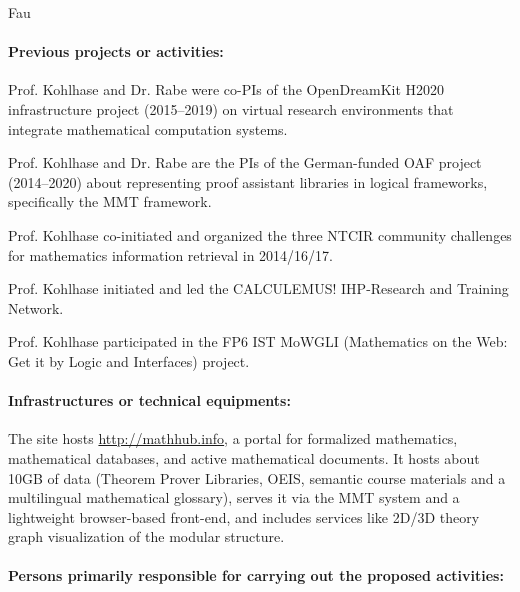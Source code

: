 \begin{sitedescription}{Fau}
\paragraph*{Previous projects or activities:}


\begin{compactitem}
 \item Prof. Kohlhase and Dr. Rabe were co-PIs of the OpenDreamKit H2020 infrastructure project (2015--2019) on virtual research environments that integrate mathematical computation systems.
 \item Prof. Kohlhase and Dr. Rabe are the PIs of the German-funded OAF project (2014--2020) about representing proof assistant libraries in logical frameworks, specifically the MMT framework.
 \item Prof. Kohlhase co-initiated and organized the three NTCIR community challenges for mathematics information retrieval in 2014/16/17.
 \item Prof. Kohlhase initiated and led the CALCULEMUS! IHP-Research and Training Network.
 \item Prof. Kohlhase participated in the FP6 IST MoWGLI (Mathematics on the Web: Get it by Logic and Interfaces) project.
\end{compactitem}

\paragraph*{Infrastructures or technical equipments:}

\begin{compactitem}
\item The site hosts \url{http://mathhub.info}, a portal for formalized mathematics, mathematical databases, and active mathematical documents.
It hosts about 10GB of data (Theorem Prover Libraries, OEIS, semantic course materials and a multilingual mathematical glossary), serves it via the MMT system and a lightweight browser-based front-end, and includes services like 2D/3D theory graph visualization of the modular structure.
\end{compactitem}

\paragraph*{Persons primarily responsible for carrying out the proposed activities:}


\end{sitedescription}
